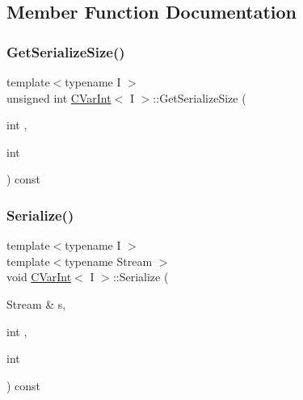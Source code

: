 \subsection{Member Function Documentation}
\mbox{\label{class_c_var_int_af994978b1b95a6b5d3009f5743ca6053}} 
\subsubsection{\texorpdfstring{Get\+Serialize\+Size()}{GetSerializeSize()}}
{\footnotesize\ttfamily template$<$typename I $>$ \\
unsigned int \mbox{\hyperlink{class_c_var_int}{C\+Var\+Int}}$<$ I $>$\+::Get\+Serialize\+Size (\begin{DoxyParamCaption}\item[{int}]{,  }\item[{int}]{ }\end{DoxyParamCaption}) const\hspace{0.3cm}{\ttfamily [inline]}}

\mbox{\label{class_c_var_int_a3b772eba5c6cd5b9ad7cec9cb45f7cb2}} 
\subsubsection{\texorpdfstring{Serialize()}{Serialize()}}
{\footnotesize\ttfamily template$<$typename I $>$ \\
template$<$typename Stream $>$ \\
void \mbox{\hyperlink{class_c_var_int}{C\+Var\+Int}}$<$ I $>$\+::Serialize (\begin{DoxyParamCaption}\item[{Stream \&}]{s,  }\item[{int}]{,  }\item[{int}]{ }\end{DoxyParamCaption}) const\hspace{0.3cm}{\ttfamily [inline]}}

\mbox{\label{class_c_var_int_aba87b78443378273b4f335dcd858c29c}} 
